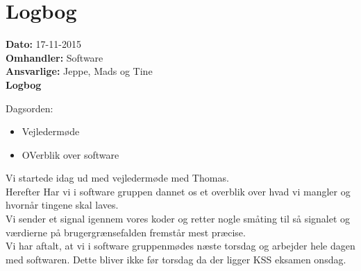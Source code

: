 \section{Logbog}

\textbf{Dato:} 17-11-2015 \\
\textbf{Omhandler:} Software \\
\textbf{Ansvarlige:} Jeppe, Mads og Tine \\
\textbf{Logbog}

Dagsorden:
\begin{itemize}
	\item Vejledermøde
	\item OVerblik over software
\end{itemize}


Vi startede idag ud med vejledermøde med Thomas.\\
Herefter Har vi i software gruppen dannet os et overblik over hvad vi mangler og hvornår tingene skal laves. \\
Vi sender et signal igennem vores koder og retter nogle småting til så signalet og værdierne på brugergrænsefalden fremstår mest præcise.\\
Vi har aftalt, at vi i software gruppenmødes næste torsdag og arbejder hele dagen med softwaren. Dette bliver ikke før torsdag da der ligger KSS eksamen onsdag.
